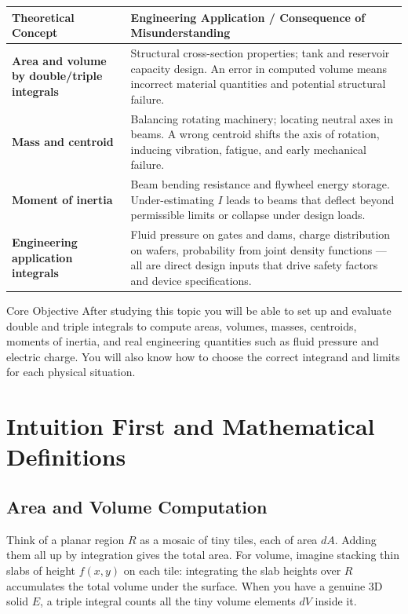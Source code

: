 \documentclass[12pt,a4paper]{article}
\begin{document}
\begin{center}
\begin{tabular}{>{\bfseries}p{6cm} p{8cm}}
\toprule
Theoretical Concept & Engineering Application / Consequence of Misunderstanding \\
\midrule
Area and volume by double/triple integrals &
Structural cross-section properties; tank and reservoir capacity design. An error in computed volume means incorrect material quantities and potential structural failure. \\[6pt]
Mass and centroid &
Balancing rotating machinery; locating neutral axes in beams. A wrong centroid shifts the axis of rotation, inducing vibration, fatigue, and early mechanical failure. \\[6pt]
Moment of inertia &
Beam bending resistance and flywheel energy storage. Under-estimating \(I\) leads to beams that deflect beyond permissible limits or collapse under design loads. \\[6pt]
Engineering application integrals &
Fluid pressure on gates and dams, charge distribution on wafers, probability from joint density functions --- all are direct design inputs that drive safety factors and device specifications. \\
\bottomrule
\end{tabular}
\end{center}

\begin{learnbox}{Core Objective}
After studying this topic you will be able to set up and evaluate double and triple integrals to compute areas, volumes, masses, centroids, moments of inertia, and real engineering quantities such as fluid pressure and electric charge. You will also know how to choose the correct integrand and limits for each physical situation.
\end{learnbox}

\section{Intuition First and Mathematical Definitions}

\subsection{Area and Volume Computation}

Think of a planar region \(R\) as a mosaic of tiny tiles, each of area \(dA\). Adding them all up by integration gives the total area. For volume, imagine stacking thin slabs of height \(f(x,y)\) on each tile: integrating the slab heights over \(R\) accumulates the total volume under the surface. When you have a genuine 3D solid \(E\), a triple integral counts all the tiny volume elements \(dV\) inside it.
\end{document}
